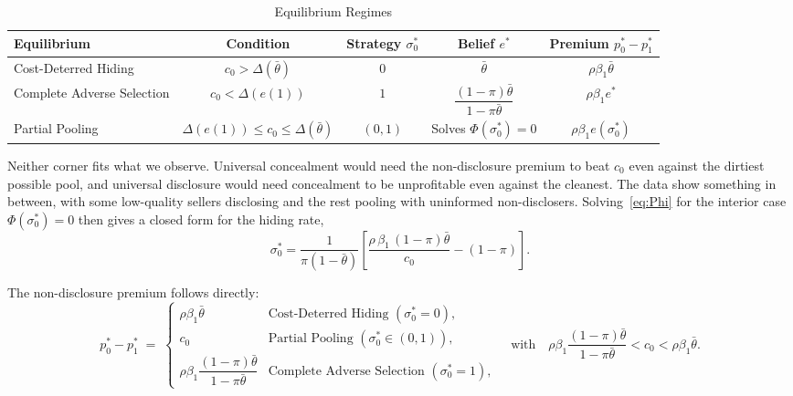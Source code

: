 \begin{table}[h]
\centering
\caption{Equilibrium Regimes}
\label{tab:equilibria}
\small\renewcommand{\arraystretch}{1.5}
\begin{tabular}{lcccc}
\toprule\toprule
\textbf{Equilibrium} & \textbf{Condition} & \textbf{Strategy $\sigma_0^*$} & \textbf{Belief $e^*$} & \textbf{Premium $p_0^*-p_1^*$} \\
\midrule
Cost-Deterred Hiding       & $c_0>\Delta(\bar{\theta})$                     & $0$     & $\bar{\theta}$                                          & $\rho\beta_1\bar{\theta}$ \\
Complete Adverse Selection & $c_0<\Delta(e(1))$                             & $1$     & $\dfrac{(1-\pi)\bar{\theta}}{1-\pi\bar{\theta}}$        & $\rho\beta_1 e^*$ \\[6pt]
Partial Pooling            & $\Delta(e(1))\leq c_0\leq\Delta(\bar{\theta})$ & $(0,1)$ & Solves $\Phi(\sigma_0^*)=0$                             & $\rho\beta_1 e(\sigma_0^*)$ \\
\bottomrule\bottomrule
\end{tabular}
\end{table}

Neither corner fits what we observe. Universal concealment would need the non-disclosure premium to beat $c_0$ even against the dirtiest possible pool, and universal disclosure would need concealment to be unprofitable even against the cleanest. The data show something in between, with some low-quality sellers disclosing and the rest pooling with uninformed non-disclosers. Solving~\eqref{eq:Phi} for the interior case $\Phi(\sigma_0^*)=0$ then gives a closed form for the hiding rate,
\[
\sigma_0^* = \frac{1}{\pi(1-\bar{\theta})}\left[\frac{\rho\,\beta_1\,(1-\pi)\bar{\theta}}{c_0} - (1-\pi)\right].
\]

The non-disclosure premium follows directly:
\begin{equation}
    p_0^*-p_1^* \;=\;
    \begin{cases}
        \rho\beta_1\bar{\theta}
            & \text{Cost-Deterred Hiding }(\sigma_0^*=0), \\[4pt]
        c_0
            & \text{Partial Pooling }(\sigma_0^*\in(0,1)), \\[4pt]
        \rho\beta_1\dfrac{(1-\pi)\bar{\theta}}{1-\pi\bar{\theta}}
            & \text{Complete Adverse Selection }(\sigma_0^*=1),
    \end{cases}
    \quad \text{with}\quad \rho\beta_1\frac{(1-\pi)\bar{\theta}}{1-\pi\bar{\theta}} < c_0 < \rho\beta_1\bar{\theta}.
    \label{eq:premium}
\end{equation}


